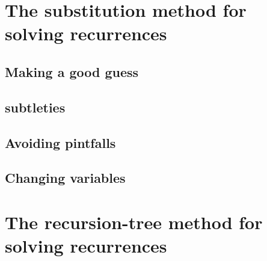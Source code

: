 \documentclass[a4paper,12pt]{article}
\begin{document}
  \section{The substitution method for solving recurrences}
  
    \subsection{Making a good guess}
    
    \subsection{subtleties}
    
    \subsection{Avoiding pintfalls}
    
    \subsection{Changing variables}
    
  \section{The recursion-tree method for solving recurrences}
    
\end{document}
